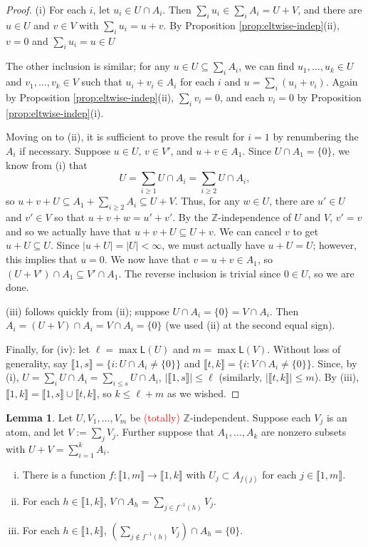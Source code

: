 \documentclass{report}
\newcommand{\ZZ}{\mathbb{Z}}
\newcommand{\llb}{\llbracket}
\newcommand{\rrb}{\rrbracket}
\renewcommand{\:}{\text{:}}
\theoremstyle{definition}
\newtheorem{lemma}[defn]{Lemma}
\begin{document}
\begin{proof}
(i) For each $i$, let $u_i\in U\cap A_i$.
Then $\sum_i u_i \in \sum_i A_i = U+V$, and there are $u\in U$ and $v\in V$ with $\sum_i u_i = u+v$.
By Proposition \ref{prop:eltwise-indep}(ii), $v = 0$ and $\sum_i u_i = u \in U$

The other inclusion is similar; for any $u\in U \subseteq \sum_i A_i$, we can find $u_1,\dots,u_k\in U$ and $v_1,\dots, v_k\in V$ such that $u_i+v_i\in A_i$ for each $i$ and $u = \sum_i (u_i + v_i)$.
Again by Proposition \ref{prop:eltwise-indep}(ii), $\sum_i v_i = 0$, and each $v_i = 0$ by Proposition \ref{prop:eltwise-indep}(i).

Moving on to (ii), it is sufficient to prove the result for $i=1$ by renumbering the $A_i$ if necessary.
Suppose $u\in U$, $v\in V'$, and $u+v\in A_1$.
Since $U\cap A_1 = \{0\}$, we know from (i) that
\[ U = \sum_{i\ge 1} U\cap A_i = \sum_{i\ge 2} U\cap A_i, \]
so $u+v + U \subseteq A_1 + \sum_{i\ge 2} A_i \subseteq U+V$.
Thus, for any $w\in U$, there are $u'\in U$ and $v'\in V$ so that $u+v+w = u'+v'$.
By the $\ZZ$-independence of $U$ and $V$, $v' = v$ and so we actually have that $u+v+U \subseteq U + v$.
We can cancel $v$ to get $u+U \subseteq U$.
Since $|u+U| = |U| <\infty$, we must actually have $u+U = U$; however, this implies that $u = 0$.
We now have that $v = u+v \in A_1$, so $(U+V')\cap A_1 \subseteq V' \cap A_1$.
The reverse inclusion is trivial since $0\in U$, so we are done.

(iii) follows quickly from (ii); suppose $U\cap A_i = \{0\} = V\cap A_i$.
Then $A_i = (U+V)\cap A_i = V\cap A_i = \{0\}$ (we used (ii) at the second equal sign).

Finally, for (iv): let $\ell = \max \mathsf{L}(U)$ and $m = \max\mathsf{L}(V)$.
Without loss of generality, say $\llb 1,s \rrb = \{i: U\cap A_i \neq \{0\} \}$ and $\llb t,k \rrb = \{i: V\cap A_i \neq \{0\} \}$.
Since, by (i), $U = \sum_i U\cap A_i = \sum_{i\le s} U \cap A_i$, $| \llb 1,s \rrb | \le \ell$ (similarly, $|\llb t,k \rrb| \le m$).
By (iii), $\llb 1,k \rrb = \llb 1,s \rrb \cup \llb t,k \rrb$, so $k \le \ell + m$ as we wished.
\end{proof}

\begin{lemma} \label{lem:indep-atom-decomp}
Let $U, V_1,\dots, V_m$ be \textcolor{red}{(totally)} $\ZZ$-independent.
Suppose each $V_j$ is an atom, and let $V := \sum_j V_j$.
Further suppose that $A_1,\dots, A_k$ are nonzero subsets with $U+V = \sum_{i=1}^k A_i$.
\begin{enumerate}[(i)]
	\item There is a function $f: \llb 1,m \rrb \to \llb 1,k \rrb$ with $U_j \subset A_{f(j)}$ for each $j\in \llb 1,m\rrb$.
	\item For each $h\in \llb 1,k\rrb$, $V\cap A_h = \sum\limits_{j\in f^{-1}(h)} V_j$.
	\item For each $h\in \llb 1,k\rrb$, $\left( \sum\limits_{j\notin f^{-1}(h)} V_j \right) \cap A_h = \{0\}$.
\end{enumerate}
\end{lemma}
\end{document}
